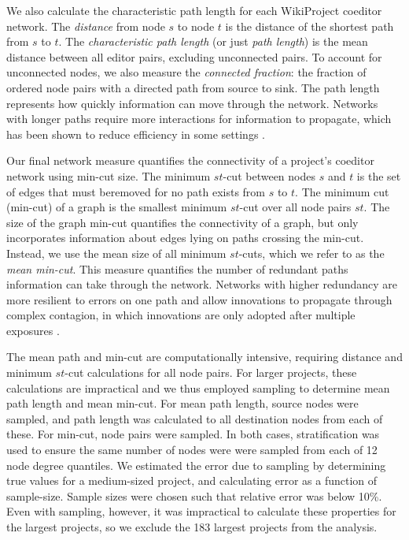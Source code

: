 \documentclass[letterpaper,twocolumn,10pt]{article}
\newcommand{\+}{\phantom{-}}
\begin{document}
We also calculate the characteristic path length for each WikiProject coeditor network.
The {\em distance} from node $s$ to node $t$ is the distance of the shortest path
from $s$ to $t$.
The {\em characteristic path length} (or just {\em path length})
is the mean distance between all editor pairs,
excluding unconnected pairs.
To account for unconnected nodes, we also measure the {\em connected fraction}:
the fraction of ordered node pairs with a directed path from source to sink.
The path length represents how quickly information can move through the network.
Networks with longer paths require more interactions for information to propagate,
which has been shown to reduce efficiency in some settings
\cite{mason_propagation_2008,barkoczi_social_2016}.

Our final network measure quantifies the connectivity of a project's coeditor
network using min-cut size.
The minimum $st$-cut between nodes $s$ and $t$ is the set of edges that must beremoved
for no path exists from $s$ to $t$.
The minimum cut (min-cut) of a graph is the smallest minimum $st$-cut over all node pairs $st$. 
The size of the graph min-cut quantifies the connectivity of a graph,
but only incorporates information about edges lying on paths crossing the min-cut.
Instead, we use the mean size of all minimum $st$-cuts, which we refer to as the
{\em mean min-cut}.
This measure quantifies the number of redundant paths information can take through the network.
Networks with higher redundancy are more resilient to errors on one path \cite{albert_error_2000}
and allow innovations to propagate through complex contagion,
in which innovations are only adopted after multiple exposures \cite{centola_complex_2007}.

The mean path and min-cut are computationally intensive,
requiring distance and minimum $st$-cut calculations for all node pairs.
For larger projects, these calculations are impractical and we thus employed
sampling to determine mean path length and mean min-cut.
For mean path length, source nodes were sampled, and path length was calculated to all destination nodes
from each of these.
For min-cut, node pairs were sampled.
In both cases, stratification was used to ensure the same number of nodes were were sampled from each of
12 node degree quantiles.
We estimated the error due to sampling by determining true values for a medium-sized project,
and calculating error as a function of sample-size.
Sample sizes were chosen such that relative error was below 10\%.
Even with sampling, however, it was impractical to calculate these properties for the largest projects,
so we exclude the 183 largest projects from the analysis.
\end{document}
